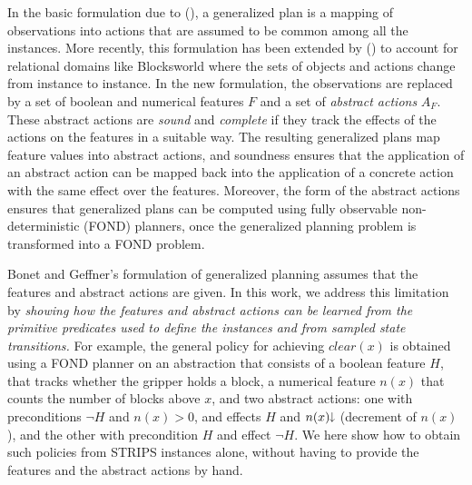 \documentclass[letterpaper]{article} %
\newcommand{\Omit}[1]{}
\newcommand{\citeay}[1]{\citeauthor{#1} (\citeyear{#1})}
\newcommand{\mminus}{\hspace{-.05em}\raisebox{.15ex}{\footnotesize$\downarrow$}}
\begin{document}
In the basic formulation due  to \citeay{hu:generalized}, a generalized plan
is a mapping of observations into actions that are assumed to be common
among  all the instances. More recently, this formulation has been extended by
\citeay{bonet:ijcai2018} to account for relational domains like Blocksworld  where the sets of
objects and  actions change from instance to instance.
In the new formulation, the observations  are replaced by  a set of boolean
and numerical features $F$ and a set of \emph{abstract actions} $A_F$.
These abstract actions are  \emph{sound} and \emph{complete} if they track the
effects  of the actions on  the features in a suitable way.
The resulting generalized plans  map feature values into abstract actions, and soundness
ensures that the application of an abstract action can be mapped back into the application of
a concrete action with the same effect  over the features. Moreover, the form of the abstract actions
ensures that generalized plans can be computed using fully observable non-deterministic (FOND) planners,
once the generalized planning problem is transformed into a FOND problem.

\Omit{
Abstract actions can increase or decrease numerical variables  $n$
associated with the numerical features (e.g., number of blocks above $x$), and while
increments  are transformed into deterministic propositional  effects $n > 0$ where $n > 0$ is
the negation of the proposition $n=0$, decrements  are  transformed  into
non-deterministic (disjunctive)  propositional effects $n > 0 \, | \, n=0$.
}

Bonet and Geffner's formulation of generalized planning  assumes that the
features and abstract actions are given. In this work, we address this limitation
by  \emph{showing  how the features and abstract actions  can be learned from
the primitive predicates used to define the instances and from sampled state transitions.}
For example,  the general policy for achieving $clear(x)$ %
is obtained using a FOND planner on an abstraction that consists of  a  boolean
feature $H$,  that tracks whether the gripper holds a block,  a numerical feature
$n(x)$ that counts the number of blocks above $x$, and two abstract actions:
one with preconditions $\neg H$ and $n(x) > 0$, and effects $H$ and $n(x)\mminus$
(decrement of $n(x)$), and the other with precondition $H$ and effect $\neg H$.
We here show how to obtain such policies from STRIPS instances alone,
without having to provide the features and the abstract actions by hand.
\end{document}
